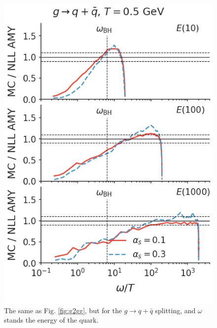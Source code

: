 \documentclass[aps, prc, reprint, amsmath, groupedaddress, nofootinbib]{revtex4-1}
\begin{document}
\begin{appendices}
\begin{figure}[t]
\includegraphics[width=\columnwidth]{spectrum_E_g2qqbar.png}
\caption{The same as Fig. \ref{fig:g2gg}, but for the $g\rightarrow q+\bar{q}$ splitting, and $\omega$ stands the energy of the quark.}
\label{fig:g2qqbar}
\end{figure}

\end{appendices}
 
\end{document}

